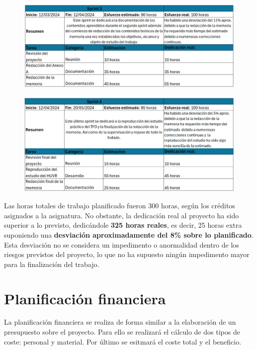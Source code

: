 \begin{figure}[H]
    \centering
    \includegraphics[width=1\textwidth]{tables/sprint3cap.png}
    \label{table:sprint3cap}
\end{figure}

\begin{figure}[H]
    \centering
    \includegraphics[width=1\textwidth]{tables/sprint4cap.png}
    \label{table:sprint4cap}
\end{figure}

Las horas totales de trabajo planificado fueron 300 horas, según los créditos asignados a la asignatura. No obstante, la dedicación real al proyecto ha sido superior a lo previsto, dedicándole \textbf{325 horas reales}, es decir, 25 horas extra suponiendo una \textbf{desviación aproximadamente del 8\% sobre lo planificado}. Esta desviación no se considera un impedimento o anormalidad dentro de los riesgos previstos del proyecto, lo que no ha supuesto ningún impedimento mayor para la finalización del trabajo.

\section{Planificación financiera} \label{sec:03Costes}

La planificación financiera se realiza de forma similar a la elaboración de un presupuesto sobre el proyecto. Para ello se realizará el cálculo de dos tipos de coste: personal y material. Por último se esitmará el coste total y el beneficio.

